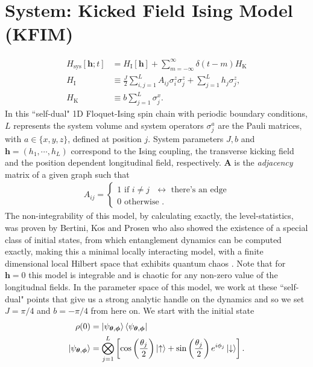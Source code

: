 \documentclass[aps,pra,reprint,amsmath,amssymb]{revtex4-2}
\newcommand{\hsys}[0]{H_{\text{sys}}}
\begin{document}
\section*{System: Kicked Field Ising Model (KFIM)} 
\begin{align}
\label{SysHam}
\hsys[{\mathbf h};t] &= H_{\text{I}}[\bm{h}]+\sum_{m=-\infty}^{\infty} \delta(t-m) H_{\text{K}}\\
H_{\text{I}}&\equiv \frac{J}{2}\sum_{i, j=1}^L A_{ij}\sigma^z_i \sigma^z_{j}+\sum_{j=1}^L h_j \sigma^z_j, \nonumber\\
H_{\text{K}}&\equiv b\sum_{j=1}^L \sigma^x_j. \nonumber
\end{align}
In this ``self-dual" 1D Floquet-Ising spin chain with periodic boundary conditions, $L$ represents the system volume and system operators $\sigma^a_j$ are the Pauli matrices, with $a\in\{x,y,z\}$, defined at position $j$. System parameters $J,b$ and ${\mathbf h}=(h_1,\cdots,h_L)$ correspond to the Ising coupling, the transverse kicking field and the position dependent longitudinal field, respectively.
$\mathbf{A}$ is the {\it adjacency} matrix of a given graph such that 
\begin{align*}
A_{ij}=
    \begin{cases}
       1 \text{ if $i \neq j$ $\leftrightarrow$  there's an edge}\\
       0 \text{ otherwise }.
    \end{cases}
\end{align*}
The non-integrability of this model, by calculating exactly, the level-statistics, was proven by Bertini, Kos and Prosen \cite{bertini2018exact} who also showed the existence of a special class of initial states, from which entanglement dynamics can be computed exactly, making this a minimal locally interacting model, with a finite dimensional local Hilbert space that exhibits quantum chaos \cite{bertini2019entanglement}. Note that for ${\mathbf h}=0$ this model is integrable and is chaotic for any non-zero value of the longitudnal fields. In the parameter space of this model, we work at these ``self-dual" points that give us a strong analytic handle on the dynamics and so we set $J=\pi/4$ and $b=-\pi/4$ from here on. We start with the initial state 
\begin{align}
    \rho(0)&=\ket{\psi_{\bm{\theta},\bm{\phi}}}\bra{\psi_{\bm{\theta},\bm{\phi}}} \nonumber \\
    \ket{\psi_{\bm{\theta},\bm{\phi}}}&= \bigotimes_{j=1}^L \left[\cos \left(\frac{\theta_j}{2}\right)\ket{\uparrow}+\sin \left(\frac{\theta_j}{2}\right)e^{i \phi_j}\ket{\downarrow}\right].
\end{align}
\end{document}

